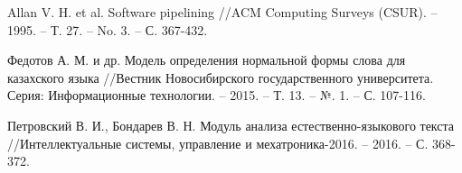 \renewcommand{\bibname}{Список использованных источников}
\begin{thebibliography}{100}

Allan V. H. et al. Software pipelining //ACM Computing Surveys (CSUR). – 1995. – Т. 27. – No. 3. – С. 367-432.

Федотов А. М. и др. Модель определения нормальной формы слова для казахского языка //Вестник Новосибирского государственного университета. Серия: Информационные технологии. – 2015. – Т. 13. – №. 1. – С. 107-116.

Петровский В. И., Бондарев В. Н. Модуль анализа естественно-языкового текста //Интеллектуальные системы, управление и мехатроника-2016. – 2016. – С. 368-372.





\end{thebibliography}

\newpage